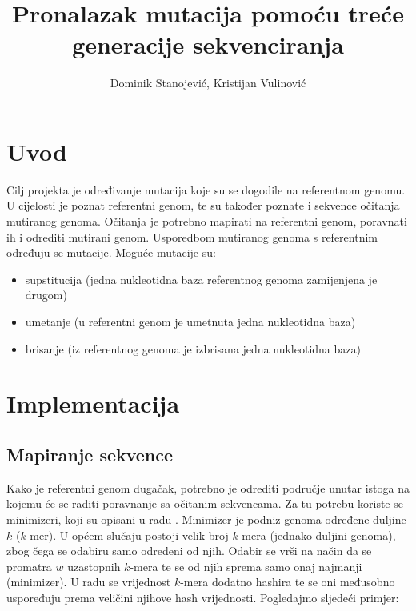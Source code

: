 \documentclass[times, utf8, seminar, numeric]{fer}
\begin{document}
\title{Pronalazak mutacija pomoću treće generacije sekvenciranja}

\author{Dominik Stanojević, Kristijan Vulinović}


\maketitle

\tableofcontents

\chapter{Uvod}
Cilj projekta je određivanje mutacija koje su se dogodile na referentnom genomu.
U cijelosti je poznat referentni genom, te su također poznate i sekvence očitanja mutiranog genoma.
Očitanja je potrebno mapirati na referentni genom, poravnati ih i odrediti mutirani genom.
Usporedbom mutiranog genoma s referentnim određuju se mutacije.
Moguće mutacije su:
\begin{itemize}
\item supstitucija (jedna nukleotidna baza referentnog genoma zamijenjena je drugom)
\item umetanje (u referentni genom je umetnuta jedna nukleotidna baza)
\item brisanje (iz referentnog genoma je izbrisana jedna nukleotidna baza)
\end{itemize}

\chapter{Implementacija}
\section{Mapiranje sekvence}
Kako je referentni genom dugačak, potrebno je odrediti područje unutar istoga na kojemu će se raditi poravnanje sa očitanim sekvencama.
Za tu potrebu koriste se minimizeri, koji su opisani u radu \cite{minimizer}.
Minimizer je podniz genoma određene duljine $k$ ($k$-mer).
U općem slučaju postoji velik broj $k$-mera (jednako duljini genoma), zbog čega se odabiru samo određeni od njih.
Odabir se vrši na način da se promatra $w$ uzastopnih $k$-mera te se od njih sprema samo onaj najmanji (minimizer).
U radu \cite{minimap} se vrijednost $k$-mera dodatno hashira te se oni međusobno uspoređuju prema veličini njihove hash vrijednosti.
Pogledajmo sljedeći primjer:
\end{document}
